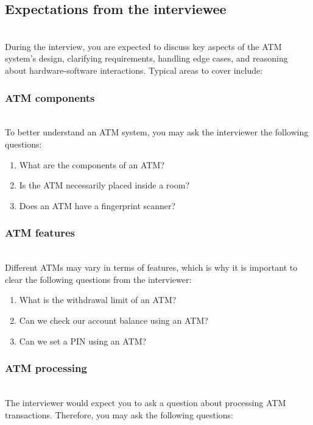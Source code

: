 \subsection{Expectations from the interviewee}\label{A0ToqGogbV0I93ewZZ4Yg}
\\
During the interview, you are expected to discuss key aspects of the ATM system's design, clarifying requirements, handling edge cases, and reasoning about hardware-software interactions. Typical areas to cover include:

\subsubsection{ATM components}\label{HXFQHgPGBVL3VJAhkRdkA}
\\
To better understand an ATM system, you may ask the interviewer the following questions:

\begin{enumerate}
\item
\protect{}\label{GoM1mgtvRy9MhdZCMOWpO}
What are the components of an ATM?
\item
\protect{}\label{P02IAljGvMyLm_DIWPvu3}
Is the ATM necessarily placed inside a room?
\item
\protect{}\label{R8yFDj_i51HWyLwvN0ZX0}
Does an ATM have a fingerprint scanner?
\end{enumerate}

\subsubsection{ATM features}\label{mTmk9GwFZQC4f3vC5NhBP}
\\
Different ATMs may vary in terms of features, which is why it is important to clear the following questions from the interviewer:

\begin{enumerate}
\item
\protect{}\label{E34MgfwnYhQhOMy-fsqmU}
What is the withdrawal limit of an ATM?
\item
\protect{}\label{cBDgPPQfFz18lom24D-XQ}
Can we check our account balance using an ATM?
\item
\protect{}\label{T4vEX1oAp0FmOHCEDyVOK}
Can we set a PIN using an ATM?
\end{enumerate}

\subsubsection{ATM processing}\label{fgILgnm2bTHPC4sdWONjZ}
\\
The interviewer would expect you to ask a question about processing ATM transactions. Therefore, you may ask the following questions:

